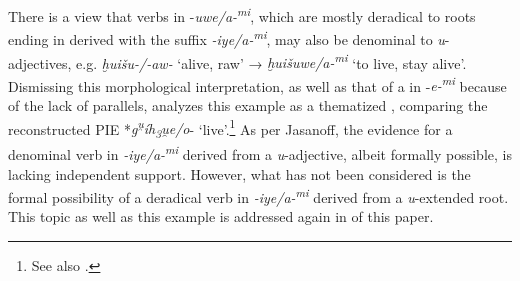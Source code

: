 \documentclass[output=paper,colorlinks,citecolor=brown]{langscibook}
\begin{document}
There is a view that verbs in -\textit{uwe/a-\textsuperscript{mi}}, which are mostly deradical to roots ending in  derived with the suffix \textit{-iye/a-\textsuperscript{mi}}, may also be denominal  to \textit{u}-adjectives, e.g. \textit{ḫuišu-/-aw-} ‘alive, raw’ → \textit{ḫuišuwe/a-\textsuperscript{mi}} ‘to live, stay alive’. Dismissing this morphological interpretation, as well as that of a  in -\textit{e\nobreakdash-\textsuperscript{mi}} because of the lack of parallels, \citet[69]{Jasanoff2023} analyzes this example as a thematized , comparing the reconstructed PIE *\textit{g\textsuperscript{u̯}íh\textsubscript{3}u̯e/o}- ‘live’.\footnote{See also \citealt[273--274\ with fn.\ 33]{VillanuevaSvensson2021}.} As per Jasanoff, the evidence for a denominal verb in \textit{-iye/a-\textsuperscript{mi}} derived from a \textit{u}-adjective, albeit formally possible, is lacking independent support. However, what has not been considered is the formal possibility of a deradical verb in \textit{-iye/a-\textsuperscript{mi}} derived from a \textit{u}-extended root. This topic as well as this example is addressed again in  of this paper.
\end{document}
